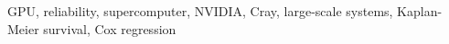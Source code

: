 \documentclass[conference]{IEEEtran}
\begin{document}
\maketitle

\begin{abstract}

\end{abstract}

\begin{IEEEkeywords}
GPU, reliability, supercomputer, NVIDIA, Cray, large-scale systems,
Kaplan-Meier survival, Cox regression
\end{IEEEkeywords}





















\end{document}

